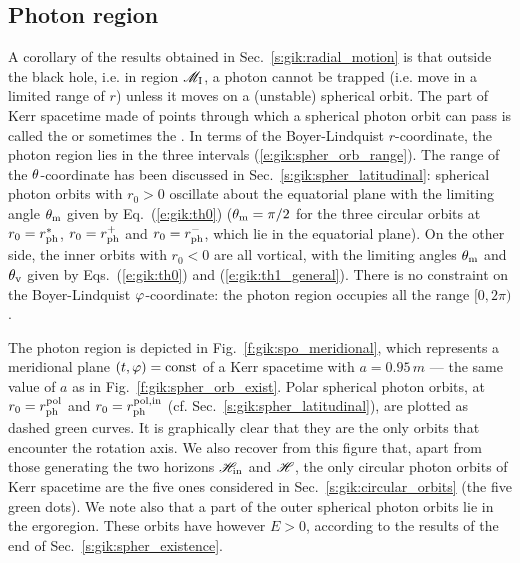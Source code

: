 \subsection{Photon region} \label{s:gik:photon_region}

A corollary of the results obtained in Sec.~\ref{s:gik:radial_motion}
is that outside the black hole, i.e. in region $\mathscr{M}_{\rm I}$, a photon
cannot be trapped (i.e. move in a limited range of $r$) unless it moves
on a (unstable) spherical orbit. The part of Kerr spacetime made of points
through which a spherical photon orbit can pass is called the
 or sometimes the  \cite{Johns_al20}. In terms of the Boyer-Lindquist $r$-coordinate, the photon region
lies in the three intervals (\ref{e:gik:spher_orb_range}).
The range of the $\theta$-coordinate has been discussed in Sec.~\ref{s:gik:spher_latitudinal}:
spherical photon orbits with $r_0 > 0$ oscillate about the equatorial plane
with the limiting angle $\theta_{\rm m}$ given by Eq.~(\ref{e:gik:th0}) ($\theta_{\rm m}=\pi/2$
for the three circular orbits at $r_0 = r_{\rm ph}^*$, $r_0=r_{\rm ph}^+$
and $r_0 = r_{\rm ph}^-$, which lie in the equatorial plane). On the other side,
the inner orbits with $r_0 < 0$ are all vortical, with the limiting
angles $\theta_{\rm m}$ and $\theta_{\rm v}$ given by Eqs.~(\ref{e:gik:th0}) and (\ref{e:gik:th1_general}).
There is no constraint on the Boyer-Lindquist $\varphi$-coordinate: the photon region occupies
all the range $[0, 2\pi)$.

The photon region is depicted in Fig.~\ref{f:gik:spo_meridional}, which represents
a meridional plane $(t,\varphi) = \mathrm{const}$ of a Kerr spacetime with $a=0.95\, m$
--- the same value of $a$ as in Fig.~\ref{f:gik:spher_orb_exist}.
Polar spherical photon orbits, at $r_0 = r_{\rm ph}^{\rm pol}$ and $r_0 = r_{\rm ph}^{\rm pol,in}$
(cf. Sec.~\ref{s:gik:spher_latitudinal}), are plotted as dashed green curves.
It is graphically clear that they are the only orbits that encounter the rotation axis.
We also recover from this figure that, apart from those generating the two horizons $\mathscr{H}_{\rm in}$
and $\mathscr{H}$, the only circular photon orbits of Kerr spacetime are the
five ones considered in Sec.~\ref{s:gik:circular_orbits} (the five green dots).
We note also that a part of the outer spherical photon orbits lie in the ergoregion. These orbits
have however $E>0$, according to the results of the end of Sec.~\ref{s:gik:spher_existence}.



